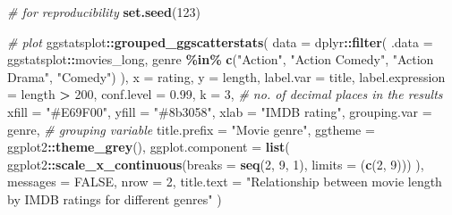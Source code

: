 \documentclass[
]{article}
\newenvironment{Shaded}{\begin{snugshade}}{\end{snugshade}}
\newcommand{\CommentTok}[1]{\textcolor[rgb]{0.56,0.35,0.01}{\textit{#1}}}
\newcommand{\DataTypeTok}[1]{\textcolor[rgb]{0.13,0.29,0.53}{#1}}
\newcommand{\DecValTok}[1]{\textcolor[rgb]{0.00,0.00,0.81}{#1}}
\newcommand{\FloatTok}[1]{\textcolor[rgb]{0.00,0.00,0.81}{#1}}
\newcommand{\KeywordTok}[1]{\textcolor[rgb]{0.13,0.29,0.53}{\textbf{#1}}}
\newcommand{\NormalTok}[1]{#1}
\newcommand{\OperatorTok}[1]{\textcolor[rgb]{0.81,0.36,0.00}{\textbf{#1}}}
\newcommand{\OtherTok}[1]{\textcolor[rgb]{0.56,0.35,0.01}{#1}}
\newcommand{\StringTok}[1]{\textcolor[rgb]{0.31,0.60,0.02}{#1}}
\begin{document}
\begin{Shaded}
\begin{Highlighting}[]
\CommentTok{\# for reproducibility}
\KeywordTok{set.seed}\NormalTok{(}\DecValTok{123}\NormalTok{)}

\CommentTok{\# plot}
\NormalTok{ggstatsplot}\OperatorTok{::}\KeywordTok{grouped\_ggscatterstats}\NormalTok{(}
  \DataTypeTok{data =}\NormalTok{ dplyr}\OperatorTok{::}\KeywordTok{filter}\NormalTok{(}
    \DataTypeTok{.data =}\NormalTok{ ggstatsplot}\OperatorTok{::}\NormalTok{movies\_long,}
\NormalTok{    genre }\OperatorTok{\%in\%}\StringTok{ }\KeywordTok{c}\NormalTok{(}\StringTok{"Action"}\NormalTok{, }\StringTok{"Action Comedy"}\NormalTok{, }\StringTok{"Action Drama"}\NormalTok{, }\StringTok{"Comedy"}\NormalTok{)}
\NormalTok{  ),}
  \DataTypeTok{x =}\NormalTok{ rating,}
  \DataTypeTok{y =}\NormalTok{ length,}
  \DataTypeTok{label.var =}\NormalTok{ title,}
  \DataTypeTok{label.expression =}\NormalTok{ length }\OperatorTok{>}\StringTok{ }\DecValTok{200}\NormalTok{,}
  \DataTypeTok{conf.level =} \FloatTok{0.99}\NormalTok{,}
  \DataTypeTok{k =} \DecValTok{3}\NormalTok{, }\CommentTok{\# no. of decimal places in the results}
  \DataTypeTok{xfill =} \StringTok{"\#E69F00"}\NormalTok{,}
  \DataTypeTok{yfill =} \StringTok{"\#8b3058"}\NormalTok{,}
  \DataTypeTok{xlab =} \StringTok{"IMDB rating"}\NormalTok{,}
  \DataTypeTok{grouping.var =}\NormalTok{ genre, }\CommentTok{\# grouping variable}
  \DataTypeTok{title.prefix =} \StringTok{"Movie genre"}\NormalTok{,}
  \DataTypeTok{ggtheme =}\NormalTok{ ggplot2}\OperatorTok{::}\KeywordTok{theme\_grey}\NormalTok{(),}
  \DataTypeTok{ggplot.component =} \KeywordTok{list}\NormalTok{(}
\NormalTok{    ggplot2}\OperatorTok{::}\KeywordTok{scale\_x\_continuous}\NormalTok{(}\DataTypeTok{breaks =} \KeywordTok{seq}\NormalTok{(}\DecValTok{2}\NormalTok{, }\DecValTok{9}\NormalTok{, }\DecValTok{1}\NormalTok{), }\DataTypeTok{limits =}\NormalTok{ (}\KeywordTok{c}\NormalTok{(}\DecValTok{2}\NormalTok{, }\DecValTok{9}\NormalTok{)))}
\NormalTok{  ),}
  \DataTypeTok{messages =} \OtherTok{FALSE}\NormalTok{,}
  \DataTypeTok{nrow =} \DecValTok{2}\NormalTok{,}
  \DataTypeTok{title.text =} \StringTok{"Relationship between movie length by IMDB ratings for different genres"}
\NormalTok{)}
\end{Highlighting}
\end{Shaded}
\end{document}
